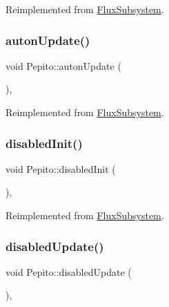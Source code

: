 Reimplemented from \hyperlink{classFluxSubsystem_a142cb34f612412e26bd0049e037dbe60}{Flux\+Subsystem}.

\mbox{\label{classPepito_a42cc57495399c63940571b113e7140f8}} 
\subsubsection{\texorpdfstring{auton\+Update()}{autonUpdate()}}
{\footnotesize\ttfamily void Pepito\+::auton\+Update (\begin{DoxyParamCaption}{ }\end{DoxyParamCaption})\hspace{0.3cm}{\ttfamily [override]}, {\ttfamily [virtual]}}



Reimplemented from \hyperlink{classFluxSubsystem_aceed900af22503022b8d1278f3693f77}{Flux\+Subsystem}.

\mbox{\label{classPepito_a04a85eae33c653f9555b6db43d50b210}} 
\subsubsection{\texorpdfstring{disabled\+Init()}{disabledInit()}}
{\footnotesize\ttfamily void Pepito\+::disabled\+Init (\begin{DoxyParamCaption}{ }\end{DoxyParamCaption})\hspace{0.3cm}{\ttfamily [override]}, {\ttfamily [virtual]}}



Reimplemented from \hyperlink{classFluxSubsystem_aa0b8fde8aa5094627d15d24e545e1da4}{Flux\+Subsystem}.

\mbox{\label{classPepito_afc29a2b7ac94a47381ca213dc2993c39}} 
\subsubsection{\texorpdfstring{disabled\+Update()}{disabledUpdate()}}
{\footnotesize\ttfamily void Pepito\+::disabled\+Update (\begin{DoxyParamCaption}{ }\end{DoxyParamCaption})\hspace{0.3cm}{\ttfamily [override]}, {\ttfamily [virtual]}}



